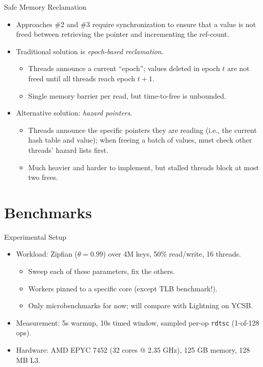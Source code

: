\documentclass[10pt,aspectratio=169]{beamer}
\begin{document}
\begin{frame}{Safe Memory Reclamation}
    \begin{itemize}
        \item Approaches \#2 and \#3 require synchronization to ensure that a
        value is not freed between retrieving the pointer and incrementing the
        ref-count.
        \item Traditional solution is \emph{epoch-based reclamation}.
        \begin{itemize}
            \item Threads announce a current ``epoch''; values deleted in epoch
            $t$ are not freed until all threads reach epoch $t + 1$.
            \item Single memory barrier per read, but time-to-free is unbounded.
        \end{itemize}
        \item Alternative solution: \emph{hazard pointers}.
        \begin{itemize}
            \item Threads announce the specific pointers they are reading (i.e.,
            the current hash table and value); when freeing a batch of values,
            must check other threads' hazard lists first.
            \item Much heavier and harder to implement, but stalled threads
            block at most two frees.
        \end{itemize}
    \end{itemize}
\end{frame}

\section{Benchmarks}

\begin{frame}{Experimental Setup}
	\begin{itemize}
		\item Workload: Zipfian (\(\theta=0.99\)) over 4M keys, 50\% read/write,
        16 threads.
        \begin{itemize}
            \item Sweep each of these parameters, fix the others.
            \item Workers pinned to a specific core (except TLB benchmark!).
            \item Only microbenchmarks for now; will compare with Lightning on
            YCSB.
        \end{itemize}
        \item Measurement: 5s warmup, 10s timed window, sampled per-op
        \texttt{rdtsc} (1-of-128 ops).
		\item Hardware: AMD EPYC 7452 (32 cores @ 2.35 GHz), 125 GB memory, 128
        MB L3.
	\end{itemize}
\end{frame}
\end{document}
